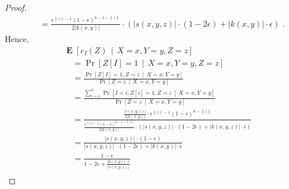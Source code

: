\documentclass[11pt]{article}
\newcommand{\norm}[1]{\left\| #1 \right\|}
\DeclareMathOperator{\Exp}{\mathbf{E}}
\begin{document}
\begin{proof}
\begin{align*}
& \quad = \frac{\epsilon^{\norm{z} - 1} (1 - \epsilon)^{n - 1 - \norm{z}}}{2|k(x,y)|} \cdot \left( |s(x,y,z)| \cdot (1 - 2\epsilon) + |k(x,y)| \cdot \epsilon \right) \; .
\end{align*}
Hence,
\begin{align*}
& \Exp\left[ c_I(Z) \, \middle| \, X = x, Y = y, Z = z \right] \\
& \quad = \Pr \left[ Z[I] = 1 \, \middle| \, X = x, Y = y, Z = z \right] \\
& \quad = \frac{\displaystyle \Pr \left[ Z[I] = 1, Z = z \, \middle| \, X = x, Y = y \right]}{\displaystyle \Pr \left[ Z = z \, \middle| \, X = x, Y = y \right]} \\
& \quad = \frac{\displaystyle \sum_{i=1}^n \Pr \left[ I = i, Z[i] = 1, Z = z \, \middle| \, X = x, Y = y \right]}{\displaystyle \Pr \left[ Z = z \, \middle| \, X = x, Y = y \right]} \\
& \quad = \frac{\displaystyle \frac{|s(x,y,z)|}{2|k(x,y)|} \cdot \epsilon^{\norm{z} - 1} (1 - \epsilon)^{n - \norm{z}}}{\displaystyle \frac{\epsilon^{\norm{z} - 1} (1 - \epsilon)^{n - 1 - \norm{z}}}{2|k(x,y)|} \cdot \left( |s(x,y,z)| \cdot (1 - 2\epsilon) + |k(x,y,z)| \cdot \epsilon \right)} \\
& \quad = \frac{\displaystyle |s(x,y,z)| \cdot (1 - \epsilon)}{\displaystyle |s(x,y,z)| \cdot (1 - 2\epsilon) + |k(x,y)| \cdot \epsilon } \\
& \quad = \frac{\displaystyle 1 - \epsilon}{\displaystyle 1 - 2\epsilon + \frac{|k(x,y)| \cdot \epsilon}{|s(x,y,z)|}} \\
\end{align*}


\end{proof}
\end{document}
